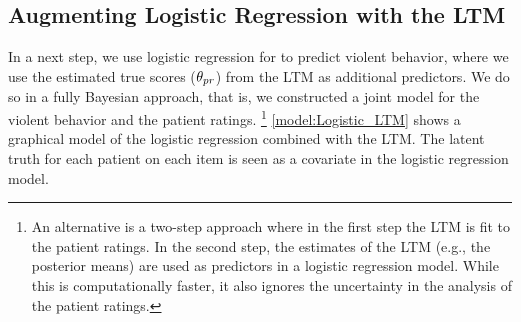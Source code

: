 \documentclass[a4paper,11pt]{article}
\begin{document}
\subsection{Augmenting Logistic Regression with the LTM}
In a next step, we use logistic regression for to predict violent behavior, where we use the estimated true scores ($\theta_{pr}$) from the LTM as additional predictors.
We do so in a fully Bayesian approach, that is, we constructed a joint model for the violent behavior and the patient ratings.%
\footnote{%
An alternative is a two-step approach where in the first step the LTM is fit to the patient ratings.
In the second step, the estimates of the LTM (e.g., the posterior means) are used as predictors in a logistic regression model.
While this is computationally faster, it also ignores the uncertainty in the analysis of the patient ratings.
}
\autoref{model:Logistic_LTM} shows a graphical model of the logistic regression combined with the LTM.
The latent truth for each patient on each item is seen as a covariate in the logistic regression model.
\end{document}
